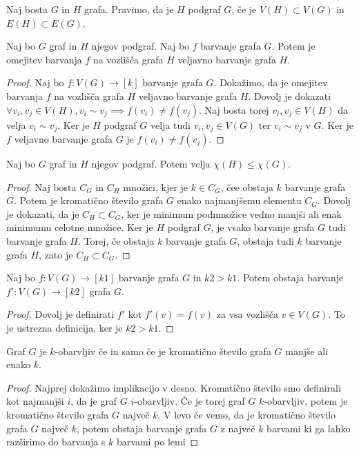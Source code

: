 \documentclass[mat1]{fmfdelo}
\begin{document}
\begin{definicija}
Naj bosta $G$ in $H$ grafa. Pravimo, da je $H$ podgraf $G$, če je $V(H)\subset V(G)$ in $E(H)\subset E(G)$.
\end{definicija}
\begin{lema}
    Naj bo $G$ graf in $H$ njegov podgraf. Naj bo $f$ barvanje grafa $G$. Potem je omejitev barvanja $f$ na vozlišča
    grafa $H$ veljavno barvanje grafa $H$.
\end{lema}
\begin{proof}
Naj bo $f:V(G)\to [k]$ barvanje grafa $G$. Dokažimo, da je omejitev barvanja $f$ na vozlišča grafa $H$ veljavno barvanje grafa $H$.
Dovolj je dokazati $\forall v_i, v_j \in V(H), v_i \sim v_j\implies f(v_i)\neq f(v_j)$. Naj bosta torej $v_i, v_j \in V(H)$ 
da velja $v_i \sim v_j$. Ker je $H$ podgraf $G$ velja tudi $v_i, v_j \in V(G)$ ter $v_i \sim v_j$ v $G$. Ker je $f$ veljavno barvanje
grafa $G$ je $f(v_i)\neq f(v_j)$.
\end{proof}


\begin{lema}
    Naj bo $G$ graf in $H$ njegov podgraf. Potem velja $\chi(H)\leq \chi(G)$.
\end{lema}
\begin{proof}
    Naj bosta $C_G$ in $C_H$ množici, kjer je $k\in C_G$, čee obstaja $k$ barvanje grafa $G$. Potem je kromatično število
    grafa $G$ enako najmanjšemu elementu $C_G$. Dovolj je dokazati, da je $C_H\subset C_G$, ker je minimum podmnožice vedno
    manjši ali enak minimumu celotne množice. Ker je $H$ podgraf $G$, je vsako barvanje grafa $G$ tudi barvanje grafa $H$.
    Torej, če obstaja $k$ barvanje grafa $G$, obstaja tudi $k$ barvanje grafa $H$, zato je $C_H\subset C_G$.
\end{proof}

\begin{lema}
    Naj bo $f:V(G)\to [k1]$ barvanje grafa $G$ in $k2>k1$. Potem obstaja barvanje $f':V(G)\to [k2]$ grafa $G$.
\end{lema}
\begin{proof}
    Dovolj je definirati $f'$ kot $f'(v) = f(v)$ za vsa vozlišča $v\in V(G)$. To je ustrezna definicija, ker je $k2>k1$.
\end{proof}

\begin{lema}
    Graf $G$ je $k$-obarvljiv če in samo če je kromatično število grafa $G$ manjše ali enako $k$.
\end{lema}
\begin{proof}
    Najprej dokažimo implikacijo v desno. Kromatično število smo definirali kot najmanjši $i$, da je graf $G$ $i$-obarvljiv.
    Če je torej graf $G$ $k$-obarvljiv, potem je kromatično število grafa $G$ največ $k$.
    V levo če vemo, da je kromatično število grafa $G$ največ $k$, potem obstaja barvanje grafa $G$ z največ $k$ barvami
    ki ga lahko razširimo do barvanja s $k$ barvami po lemi 
\end{proof}
\end{document}
